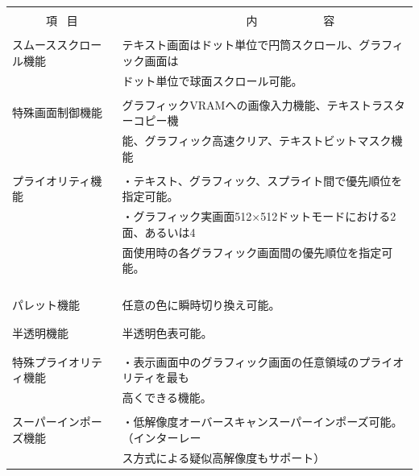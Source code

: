 \documentclass[twoside,a4paper,12pt]{article}
\begin{document}
\setlength{\tabcolsep}{0.5mm}
\begin{tabular}{|p{44mm}|p{123mm}|}
\hline
&\\[-2mm]
\ \ \ \ \ \ 項 \ 目 & \ \ \ \ \ \ \ \ \ \ \ \ \ \ \ \ \ \ \ \ \ \ 内 \ \ \ \ \ \ \ \ \ \ \ 容\\[4mm]
\hline
&\\[-3mm]
スムーススクロール機能 & テキスト画面はドット単位で円筒スクロール、グラフィック画面は\\
& ドット単位で球面スクロール可能。\\
\hline
&\\[-3mm]
特殊画面制御機能 & グラフィックVRAMへの画像入力機能、テキストラスターコピー機\\
& 能、グラフィック高速クリア、テキストビットマスク機能\\
\hline
&\\[-3mm]
プライオリティ機能 & ・テキスト、グラフィック、スプライト間で優先順位を指定可能。\\
& ・グラフィック実画面512×512ドットモードにおける2面、あるいは4\\
& 面使用時の各グラフィック画面間の優先順位を指定可能。\\
&\\
&\\
&\\
\hline
&\\[-3mm]
パレット機能 & 任意の色に瞬時切り換え可能。\\
&\\
\hline
&\\[-3mm]
半透明機能 & 半透明色表可能。\\
&\\
\hline
&\\[-3mm]
特殊プライオリティ機能 & ・表示画面中のグラフィック画面の任意領域のプライオリティを最も\\
& 高くできる機能。\\
\hline
&\\[-3mm]
スーパーインポーズ機能 & ・低解像度オーバースキャンスーパーインポーズ可能。（インターレー\\
& ス方式による疑似高解像度もサポート）\\
\hline
\end{tabular}\\[1mm]
\end{document}
